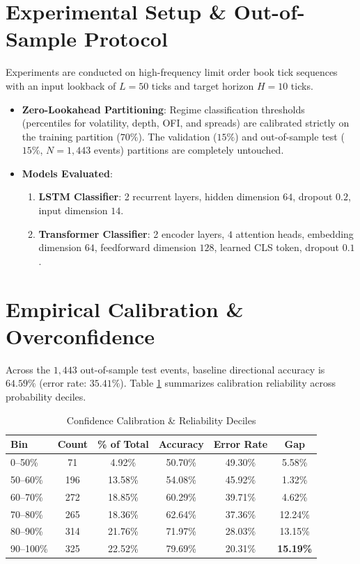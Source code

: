 \documentclass[10pt,twocolumn,letterpaper]{article}
\begin{document}
\section{Experimental Setup \& Out-of-Sample Protocol}
Experiments are conducted on high-frequency limit order book tick sequences with an input lookback of $L=50$ ticks and target horizon $H=10$ ticks.
\begin{itemize}
    \item \textbf{Zero-Lookahead Partitioning}: Regime classification thresholds (percentiles for volatility, depth, OFI, and spreads) are calibrated strictly on the training partition ($70\%$). The validation ($15\%$) and out-of-sample test ($15\%$, $N=1,443$ events) partitions are completely untouched.
    \item \textbf{Models Evaluated}:
    \begin{enumerate}
        \item \textbf{LSTM Classifier}: 2 recurrent layers, hidden dimension $64$, dropout $0.2$, input dimension $14$.
        \item \textbf{Transformer Classifier}: 2 encoder layers, $4$ attention heads, embedding dimension $64$, feedforward dimension $128$, learned CLS token, dropout $0.1$.
    \end{enumerate}
\end{itemize}

\section{Empirical Calibration \& Overconfidence}
Across the $1,443$ out-of-sample test events, baseline directional accuracy is $64.59\%$ (error rate: $35.41\%$). Table \ref{tab:calibration} summarizes calibration reliability across probability deciles.

\begin{table}[h]
\centering
\caption{Confidence Calibration & Reliability Deciles}
\label{tab:calibration}
\small
\begin{tabular}{lccccc}
\toprule
\textbf{Bin} & \textbf{Count} & \textbf{\% of Total} & \textbf{Accuracy} & \textbf{Error Rate} & \textbf{Gap} \\
\midrule
0--50\%   & 71  & 4.92\%  & 50.70\% & 49.30\% & 5.58\% \\
50--60\%  & 196 & 13.58\% & 54.08\% & 45.92\% & 1.32\% \\
60--70\%  & 272 & 18.85\% & 60.29\% & 39.71\% & 4.62\% \\
70--80\%  & 265 & 18.36\% & 62.64\% & 37.36\% & 12.24\% \\
80--90\%  & 314 & 21.76\% & 71.97\% & 28.03\% & 13.15\% \\
90--100\% & 325 & 22.52\% & 79.69\% & 20.31\% & \textbf{15.19\%} \\
\bottomrule
\end{tabular}
\end{table}
\end{document}
